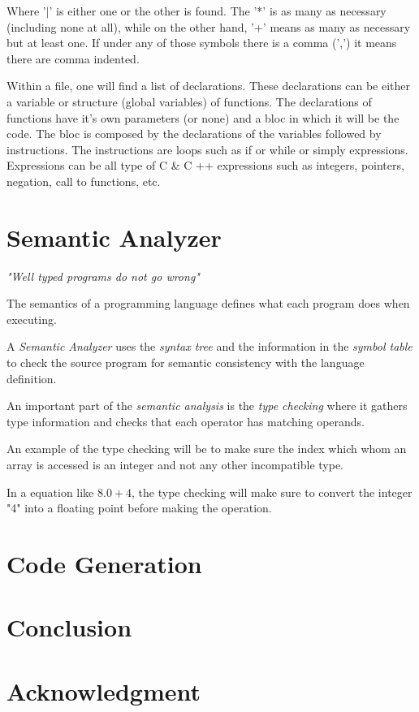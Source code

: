 \documentclass[conference]{IEEEtran}
\begin{document}
Where '$|$' is either one or the other is found. The '*' is as many as necessary (including none at all), while on the other hand, '+' means as many as necessary but at least one. If under any of those symbols there is a comma (',') it means there are comma indented.

Within a file, one will find a list of declarations. These declarations can be either a variable or structure (global variables) of functions. The declarations of functions have it's own parameters (or none) and a bloc in which it will be the code.
The bloc is composed by the declarations of the variables followed by instructions. The instructions are loops such as if or while or simply expressions. Expressions can be all type of C \& C ++ expressions such as integers, pointers, negation, call to functions, etc.   

\section{Semantic Analyzer}
\textit{"Well typed programs do not go wrong"}

The semantics of a programming language defines what each program does when executing.

A \textit{Semantic Analyzer} uses the \textit{syntax tree} and the information in the \textit{symbol table} to check the source program for semantic consistency with the language definition. 

An important part of the \textit{semantic analysis} is the \textit{type checking} where it gathers type information and checks that each operator has matching operands.

An example of the type checking will be to make sure the index which whom an array is accessed is an integer and not any other incompatible type.

In a equation like \(8.0 + 4\), the type checking will make sure to convert the integer "4" into a floating point before making the operation. 

\section{Code Generation}



\section{Conclusion}

\section*{Acknowledgment}

\newpage
{}


\end{document}
